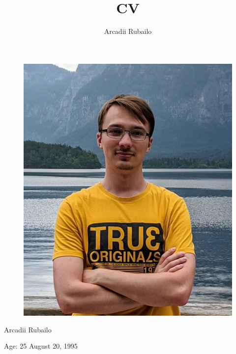 \documentclass[12pt, a4paper]{article}
\title{CV}
\author{Arcadii Rubailo}
\begin{document}
\begin{minipage}[t]{0.35\textwidth}
    \begin{figure}[H]
        \vspace*{-12pt}
        \includegraphics[width=\textwidth]{profile}
    \end{figure}
    
    \begin{center}
        Arcadii Rubailo
    
        Age: 25 August 20, 1995
    \end{center}
    

\end{minipage}
\end{document}
